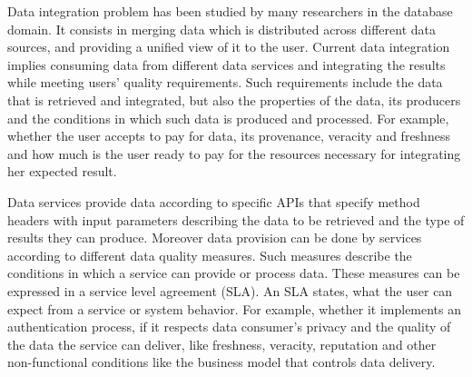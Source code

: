 Data integration problem has been studied by many researchers in the database domain. It consists in merging data which is distributed across different data sources, and providing a unified view of it to the user.
% 
Current data integration implies consuming data from different data services and integrating the results while meeting users' quality requirements. Such requirements include the data that is retrieved and integrated, but also the properties of the data, its producers and the conditions in which such data is produced and processed. For example, whether the user accepts to pay for data, its provenance, veracity and freshness and how much is the user ready to pay for the resources necessary for integrating her expected result. 

Data services provide data according to specific APIs that specify method headers with input parameters describing the data to be retrieved and the type of results they can produce. Moreover data provision can be done by services according to different data quality measures. Such measures describe the conditions in which a service can provide or process data. These measures can be expressed in a service level agreement (SLA). An SLA states, what the user can expect from a service or system behavior. For example, whether it implements an authentication process, if it respects data consumer's privacy and the quality of the data the service can deliver, like freshness, veracity, reputation and other non-functional conditions like the business model that controls data delivery.   

